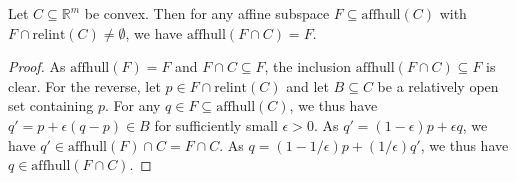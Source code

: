 \documentclass[anon,12pt]{colt2021} %
\newcommand{\Comments}{1}
\newcommand{\mynote}[2]{\ifnum\Comments=1\textcolor{#1}{#2}\fi}
\newcommand{\raf}[1]{\mynote{green}{[RF: #1]}}
\newcommand{\bo}[1]{\mynote{blue}{[Bo: #1]}}
\newcommand{\reals}{\mathbb{R}}
\newcommand{\relint}[1]{\mathrm{relint}(#1)}
\newcommand{\affhull}{\mathrm{affhull}}
\begin{document}

\begin{lemma}\label{lem:affhull-relint}
	Let $C\subseteq\reals^m$ be convex.
	Then for any affine subspace $F\subseteq\affhull(C)$ with $F\cap\relint C \neq \emptyset$, we have $\affhull(F\cap C) = F$.
\end{lemma}
\begin{proof}
	As $\affhull(F) = F$ and $F\cap C\subseteq F$, the inclusion $\affhull(F\cap C) \subseteq F$ is clear.
	For the reverse, let $p\in F\cap\relint C$ and let $B\subseteq C$ be a relatively open set containing $p$.
	For any $q\in F \subseteq \affhull(C)$, we thus have $q' = p + \epsilon (q-p) \in B$ for sufficiently small $\epsilon > 0$.
	As $q' = (1-\epsilon) p + \epsilon q$, we have $q' \in \affhull(F)\cap C = F\cap C$.
	As $q = (1-1/\epsilon) p + (1/\epsilon) q'$, we thus have $q\in\affhull(F\cap C)$.
\end{proof}
\end{document}
